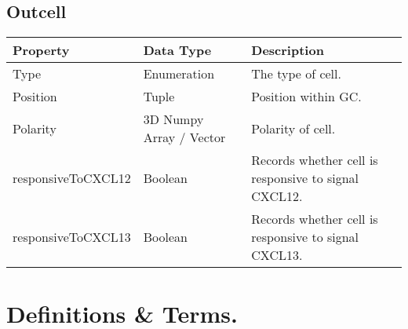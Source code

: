 \documentclass[english]{article}
\begin{document}
\subsection{Outcell}
\begin{center}
\begin{tabular}{|C{2.1in}|C{2.1in}|C{2.1in}|}
\hline
\textbf{Property} & \textbf{Data Type} & \textbf{Description}
\tabularnewline
\hline
\hline
Type & Enumeration & The type of cell. 
\tabularnewline
\hline
Position & Tuple & Position within GC.
\tabularnewline
\hline
Polarity & 3D Numpy Array / Vector & Polarity of cell.
\tabularnewline
\hline
responsiveToCXCL12 & Boolean & Records whether cell is responsive to signal CXCL12.
\tabularnewline
\hline
responsiveToCXCL13 & Boolean & Records whether cell is responsive to signal CXCL13.
\tabularnewline
\hline

\end{tabular}
\end{center}


\newpage
\section{Definitions \& Terms.}
\end{document}
